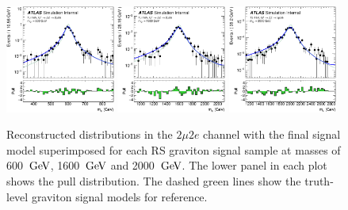\begin{figure}[htbp]
    \centering
    \includegraphics[width=0.32\textwidth]{figures/HMHZZ/signal/RSGraviton/graviton_reco_shape_m4l_constrained_HM_600GeV_2mu2e.eps}
    \includegraphics[width=0.32\textwidth]{figures/HMHZZ/signal/RSGraviton/graviton_reco_shape_m4l_constrained_HM_1600GeV_2mu2e.eps}
    \includegraphics[width=0.32\textwidth]{figures/HMHZZ/signal/RSGraviton/graviton_reco_shape_m4l_constrained_HM_2000GeV_2mu2e.eps}
    \caption{Reconstructed \mfl distributions in the $2\mu 2e$ channel with the final signal
        model superimposed for each RS graviton signal sample at masses of 600~$\text{Ge\kern -0.1em V}$, 1600~$\text{Ge\kern -0.1em V}$ and 2000~$\text{Ge\kern -0.1em V}$. The lower panel in each plot shows
        the pull distribution. The dashed green lines show the truth-level graviton signal models for reference.}
    \label{fig:graviton_reco_shape_2mu2e}
\end{figure}
